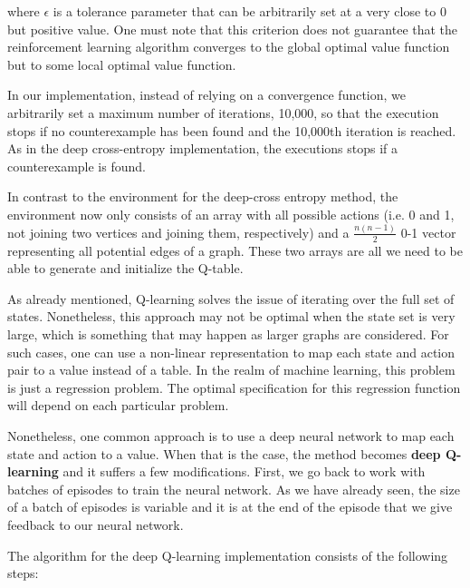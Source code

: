 \documentclass[11pt]{article}
\theoremstyle{definition}
\begin{document}
where $\epsilon$ is a tolerance parameter that can be arbitrarily set at a very close to 0 but positive value. One must note that this criterion does not guarantee that the reinforcement learning algorithm converges to the global optimal value function but to some local optimal value function.  

In our implementation, instead of relying on a convergence function, we arbitrarily set a maximum number of iterations, 10,000, so that the execution stops if no counterexample has been found and the 10,000th iteration is reached. As in the deep cross-entropy implementation, the executions stops if a counterexample is found.

In contrast to the environment for the deep-cross entropy method, the environment now only consists of an array with all possible actions (i.e. 0 and 1, not joining two vertices and joining them, respectively) and a $\frac{n(n-1)}{2}$ 0-1 vector representing all potential edges of a graph. These two arrays are all we need to be able to generate and initialize the Q-table.

As already mentioned, Q-learning solves the issue of iterating over the full set of states. Nonetheless, this approach may not be optimal when the state set is very large, which is something that may happen as larger graphs are considered. For such cases, one can use a non-linear representation to map each state and action pair to a value instead of a table. In the realm of machine learning, this problem is just a regression problem. The optimal specification for this regression function will depend on each particular problem. 

Nonetheless, one common approach is to use a deep neural network to map each state and action to a value. When that is the case, the method becomes \textbf{deep Q-learning} and it suffers a few modifications. First, we go back to work with batches of episodes to train the neural network. As we have already seen, the size of a batch of episodes is variable and it is at the end of the episode that we give feedback to our neural network. 

The algorithm for the deep Q-learning implementation consists of the following steps: 
\end{document}

